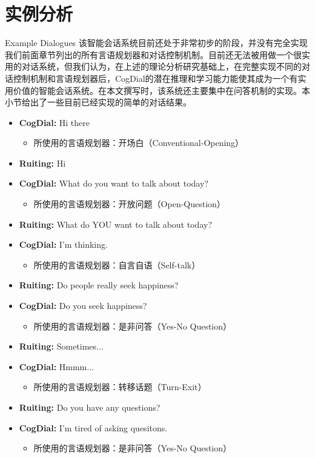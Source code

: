 \section{实例分析}{Example Dialogues}
该智能会话系统目前还处于非常初步的阶段，并没有完全实现我们前面章节列出的所有言语规划器和对话控制机制。目前还无法被用做一个很实用的对话系统，但我们认为，在上述的理论分析研究基础上，在完整实现不同的对话控制机制和言语规划器后，CogDial的潜在推理和学习能力能使其成为一个有实用价值的智能会话系统。在本文撰写时，该系统还主要集中在问答机制的实现。本小节给出了一些目前已经实现的简单的对话结果。
\begin{itemize}

\item {\bf CogDial:} Hi there
\begin{itemize}
\item 所使用的言语规划器：开场白（Conventional-Opening）
\end{itemize}

\item {\bf Ruiting:} Hi

\item {\bf CogDial:} What do you want to talk about today?
\begin{itemize}
\item 所使用的言语规划器：开放问题（Open-Question）
\end{itemize}

\item {\bf Ruiting:} What do YOU want to talk about today?

\item {\bf CogDial:} I'm thinking.
\begin{itemize}
\item 所使用的言语规划器：自言自语（Self-talk）
\end{itemize}

\item {\bf Ruiting:} Do people really seek happiness?

\item {\bf CogDial:} Do you seek happiness?
\begin{itemize}
\item 所使用的言语规划器：是非问答（Yes-No Question）
\end{itemize}

\item {\bf Ruiting:} Sometimes...

\item {\bf CogDial:} Hmmm...
\begin{itemize}
\item 所使用的言语规划器：转移话题（Turn-Exit）
\end{itemize}

\item {\bf Ruiting:} Do you have any questions?

\item {\bf CogDial:} I'm tired of asking quesitons.
\begin{itemize}
\item 所使用的言语规划器：是非问答（Yes-No Question）
\end{itemize}
\end{itemize}


